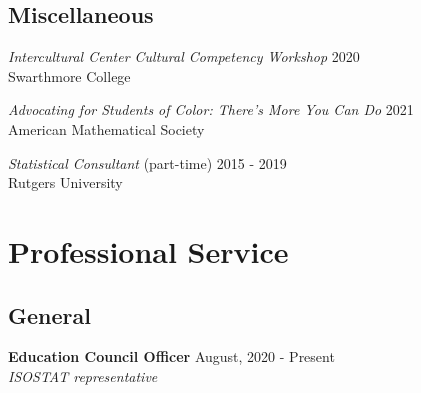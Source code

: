 \documentclass[margin,line]{res}
\newenvironment{list1}{
  \begin{list}{\ding{113}}{%
      \setlength{\itemsep}{0in}
      \setlength{\parsep}{0in} \setlength{\parskip}{0in}
      \setlength{\topsep}{0in} \setlength{\partopsep}{0in} 
      \setlength{\leftmargin}{0.17in}}}{\end{list}}
\begin{document}
\begin{resume}
\subsection{Miscellaneous}
\begin{list1}
\item[] {\em Intercultural Center Cultural Competency Workshop} \hfill 2020\\
Swarthmore College 
\vspace*{2mm}
\item[] {\em Advocating for Students of Color: There's More You Can Do} \hfill 2021\\
American Mathematical Society
\vspace*{2mm}
\item[] {\em Statistical Consultant} (part-time) \hfill 2015 - 2019\\
Rutgers University
\end{list1}


\section{\sc Professional Service}
\vspace{-.3cm}
\subsection{General}
\begin{list1}
\item[] {\bf Education Council Officer} \hfill {August, 2020 - Present}\\
{\em ISOSTAT representative}
\vspace*{2mm}
 

\end{list1}
\end{resume}
\end{document}
